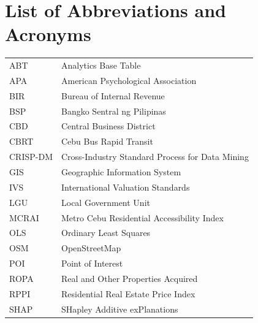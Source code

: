 \clearpage
\section*{List of Abbreviations and Acronyms}

\begin{longtable}{p{} p{}}
ABT & Analytics Base Table \\
APA & American Psychological Association \\
BIR & Bureau of Internal Revenue \\
BSP & Bangko Sentral ng Pilipinas \\
CBD & Central Business District \\
CBRT & Cebu Bus Rapid Transit \\
CRISP-DM & Cross-Industry Standard Process for Data Mining \\
GIS & Geographic Information System \\
IVS & International Valuation Standards \\
LGU & Local Government Unit \\
MCRAI & Metro Cebu Residential Accessibility Index \\
OLS & Ordinary Least Squares \\
OSM & OpenStreetMap \\
POI & Point of Interest \\
ROPA & Real and Other Properties Acquired \\
RPPI & Residential Real Estate Price Index \\
SHAP & SHapley Additive exPlanations \\
\end{longtable}
\addtocounter{table}{-1}
